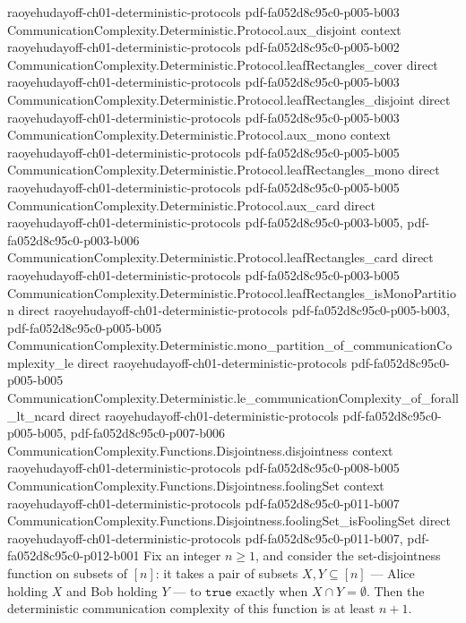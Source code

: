 \begin{theorem}
  {raoyehudayoff-ch01-deterministic-protocols}
  {pdf-fa052d8c95c0-p005-b003}
\proofstep
  {CommunicationComplexity.Deterministic.Protocol.aux_disjoint}
  {context}
  {raoyehudayoff-ch01-deterministic-protocols}
  {pdf-fa052d8c95c0-p005-b002}
\proofstep
  {CommunicationComplexity.Deterministic.Protocol.leafRectangles_cover}
  {direct}
  {raoyehudayoff-ch01-deterministic-protocols}
  {pdf-fa052d8c95c0-p005-b003}
\proofstep
  {CommunicationComplexity.Deterministic.Protocol.leafRectangles_disjoint}
  {direct}
  {raoyehudayoff-ch01-deterministic-protocols}
  {pdf-fa052d8c95c0-p005-b003}
\proofstep
  {CommunicationComplexity.Deterministic.Protocol.aux_mono}
  {context}
  {raoyehudayoff-ch01-deterministic-protocols}
  {pdf-fa052d8c95c0-p005-b005}
\proofstep
  {CommunicationComplexity.Deterministic.Protocol.leafRectangles_mono}
  {direct}
  {raoyehudayoff-ch01-deterministic-protocols}
  {pdf-fa052d8c95c0-p005-b005}
\proofstep
  {CommunicationComplexity.Deterministic.Protocol.aux_card}
  {direct}
  {raoyehudayoff-ch01-deterministic-protocols}
  {pdf-fa052d8c95c0-p003-b005,
    pdf-fa052d8c95c0-p003-b006}
\proofstep
  {CommunicationComplexity.Deterministic.Protocol.leafRectangles_card}
  {direct}
  {raoyehudayoff-ch01-deterministic-protocols}
  {pdf-fa052d8c95c0-p003-b005}
\proofstep
  {CommunicationComplexity.Deterministic.Protocol.leafRectangles_isMonoPartition}
  {direct}
  {raoyehudayoff-ch01-deterministic-protocols}
  {pdf-fa052d8c95c0-p005-b003,
    pdf-fa052d8c95c0-p005-b005}
\proofstep
  {CommunicationComplexity.Deterministic.mono_partition_of_communicationComplexity_le}
  {direct}
  {raoyehudayoff-ch01-deterministic-protocols}
  {pdf-fa052d8c95c0-p005-b005}
\proofstep
  {CommunicationComplexity.Deterministic.le_communicationComplexity_of_forall_lt_ncard}
  {direct}
  {raoyehudayoff-ch01-deterministic-protocols}
  {pdf-fa052d8c95c0-p005-b005,
    pdf-fa052d8c95c0-p007-b006}
\proofstep
  {CommunicationComplexity.Functions.Disjointness.disjointness}
  {context}
  {raoyehudayoff-ch01-deterministic-protocols}
  {pdf-fa052d8c95c0-p008-b005}
\proofstep
  {CommunicationComplexity.Functions.Disjointness.foolingSet}
  {context}
  {raoyehudayoff-ch01-deterministic-protocols}
  {pdf-fa052d8c95c0-p011-b007}
\proofstep
  {CommunicationComplexity.Functions.Disjointness.foolingSet_isFoolingSet}
  {direct}
  {raoyehudayoff-ch01-deterministic-protocols}
  {pdf-fa052d8c95c0-p011-b007,
    pdf-fa052d8c95c0-p012-b001}
Fix an integer $n \ge 1$, and consider the set-disjointness function on subsets of
$[n]$: it takes a pair of subsets $X, Y \subseteq [n]$ — Alice holding $X$ and Bob
holding $Y$ — to $\mathtt{true}$ exactly when $X \cap Y = \emptyset$. Then the
deterministic communication complexity of this function is at least $n + 1$.
\end{theorem}

